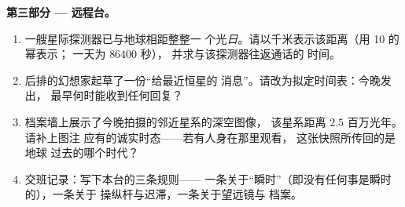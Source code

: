 \begin{problem}
\medskip\noindent\textbf{第三部分 --- 远程台。}
\begin{enumerate}[resume]
  \item 一艘星际探测器已与地球相距整整一
        个光\emph{日}。请以千米表示该距离（用 10 的幂表示；
        一天为 $86400$ 秒），
        并求与该探测器往返通话的
        时间。
  \item 后排的幻想家起草了一份“给最近恒星的
        消息”。请改为拟定时间表：今晚发出，
        最早何时能收到任何回复？
  \item 档案墙上展示了今晚拍摄的邻近星系的深空图像，
        该星系距离 $2.5$ 百万光年。请补上图注
        应有的诚实时态——若有人身在那里观看，
        这张快照所传回的是地球
        过去的哪个时代？
  \item 交班记录：写下本台的三条规则——
        一条关于“瞬时”（即没有任何事是瞬时的），一条关于
        操纵杆与迟滞，一条关于望远镜与
        档案。
\end{enumerate}
\end{problem}

